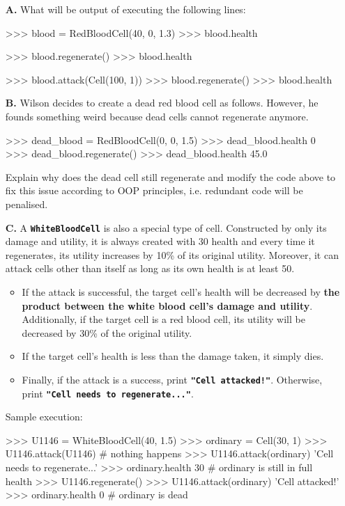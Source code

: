 \begin{enumerate}
\item[\textbf{A.}]
What will be output of executing the following lines:
\begin{python}
>>> blood = RedBloodCell(40, 0, 1.3)
>>> blood.health

>>> blood.regenerate()
>>> blood.health

>>> blood.attack(Cell(100, 1))
>>> blood.regenerate()
>>> blood.health
\end{python}
\begin{flushright}
    [2 marks]
\end{flushright}

\item[\textbf{B.}]
Wilson decides to create a dead red blood cell as follows. However, he founds something weird because dead cells cannot regenerate anymore.
\begin{python}
>>> dead_blood = RedBloodCell(0, 0, 1.5)
>>> dead_blood.health
0
>>> dead_blood.regenerate()
>>> dead_blood.health
45.0
\end{python}
Explain why does the dead cell still regenerate and modify the code above to fix this issue according to OOP principles, i.e. 
redundant code will be penalised.
\begin{flushright}
    [4 marks]
\end{flushright}

\item[\textbf{C.}]
A \colorbox{CornflowerBlue!20}{\texttt{\textbf{WhiteBloodCell}}} is also a special type of cell. Constructed by only its damage and utility, it is always created 
with 30 health and every time it regenerates, its utility increases by 10\% of its original utility. Moreover, it can attack cells other than itself as long as 
its own health is at least 50.
\begin{itemize}
\item If the attack is successful, the target cell's health will be decreased by \textbf{the product between the white blood cell's damage and utility}. Additionally, 
if the target cell is a red blood cell, its utility will be decreased by 30\% of the original utility.
\item If the target cell's health is less than the damage taken, it simply dies.
\item Finally, if the attack is a success, print \texttt{\bfseries "Cell attacked!"}. Otherwise, print \texttt{\bfseries "Cell needs to regenerate..."}.
\end{itemize}
Sample execution:
\begin{python}
>>> U1146 = WhiteBloodCell(40, 1.5)
>>> ordinary = Cell(30, 1)
>>> U1146.attack(U1146)     # nothing happens
>>> U1146.attack(ordinary)
'Cell needs to regenerate...'
>>> ordinary.health
30                          # ordinary is still in full health
>>> U1146.regenerate()
>>> U1146.attack(ordinary)
'Cell attacked!'
>>> ordinary.health
0                           # ordinary is dead


\end{python}
\end{enumerate}
